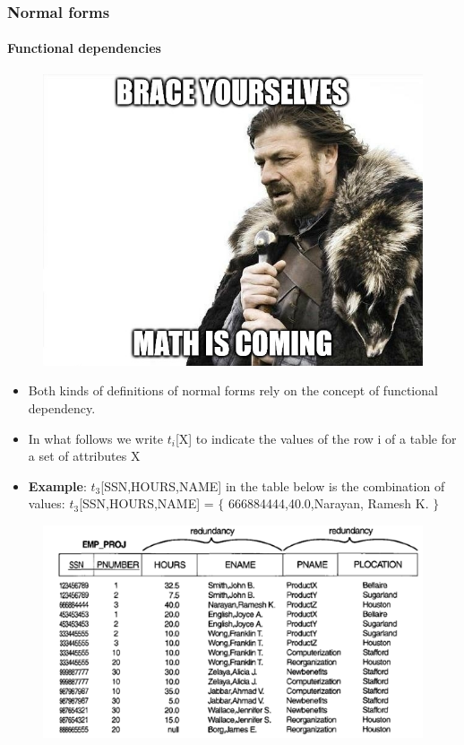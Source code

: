 \documentclass{beamer}
\newcommand{\valseq}[1]{$\lbrace$ #1 $\rbrace$}
\newcommand{\tuple}[2]{$t_{#1}$[#2]}
\begin{document}
\begin{frame}
	\frametitle{Normal forms}
	\framesubtitle{Functional dependencies}
	
	\begin{figure}
		\includegraphics[scale=0.75]{img/normalization/mathiscoming}
	\end{figure}
\end{frame}

\begin{frame}
	
	\begin{itemize}
		\item Both kinds of definitions of normal forms rely on the concept of functional dependency.
		\item In what follows we write \tuple{i}{X} to indicate the values of the row i of a table for a set of attributes X
		\item \textbf{Example}: \tuple{3}{SSN,HOURS,NAME} in the table below is the combination of values: 
		\tuple{3}{SSN,HOURS,NAME} = \valseq{666884444,40.0,Narayan, Ramesh K.}
	\end{itemize}
	
	\begin{figure}
		\includegraphics[scale=0.4]{img/normalization/norm5}
	\end{figure}
\end{frame}
\end{document}

